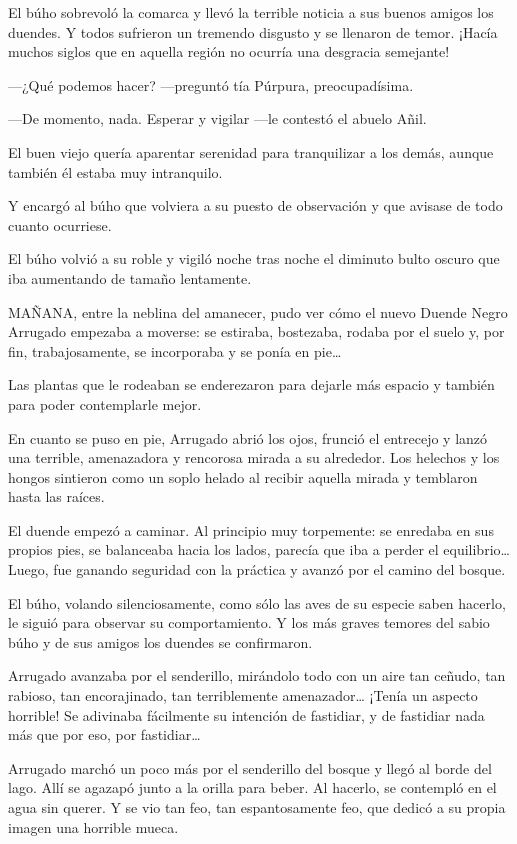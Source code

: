 \documentclass{barcodevapor3pags}
\begin{document}
El búho sobrevoló la comarca y llevó la terrible noticia a sus buenos
amigos los duendes. Y todos sufrieron un tremendo disgusto y se llenaron
de temor. ¡Hacía muchos siglos que en aquella región no ocurría una
desgracia semejante!

---¿Qué podemos hacer? ---preguntó tía Púrpura, preocupadísima.

---De momento, nada. Esperar y vigilar ---le contestó el abuelo Añil.

El buen viejo quería aparentar serenidad para tranquilizar a los demás,
aunque también él estaba muy intranquilo.

Y encargó al búho que volviera a su puesto de observación y que avisase
de todo cuanto ocurriese.

El búho volvió a su roble y vigiló noche tras noche el diminuto bulto
oscuro que iba aumentando de tamaño lentamente.

\capitulo

 MAÑANA, entre la neblina del amanecer, pudo ver cómo el nuevo Duende
Negro Arrugado empezaba a moverse: se estiraba, bostezaba, rodaba por el
suelo y, por fin, trabajosamente, se incorporaba y se ponía en
pie\ldots{}

Las plantas que le rodeaban se enderezaron para dejarle más espacio y
también para poder contemplarle mejor.

En cuanto se puso en pie, Arrugado abrió los ojos, frunció el entrecejo
y lanzó una terrible, amenazadora y rencorosa mirada a su alrededor. Los
helechos y los hongos sintieron como un soplo helado al recibir aquella
mirada y temblaron hasta las raíces.

El duende empezó a caminar. Al principio muy torpemente: se enredaba en
sus propios pies, se balanceaba hacia los lados, parecía que iba a
perder el equilibrio\ldots{} Luego, fue ganando seguridad con la
práctica y avanzó por el camino del bosque.

El búho, volando silenciosamente, como sólo las aves de su especie saben
hacerlo, le siguió para observar su comportamiento. Y los más graves
temores del sabio búho y de sus amigos los duendes se confirmaron.

Arrugado avanzaba por el senderillo, mirándolo todo con un aire tan
ceñudo, tan rabioso, tan encorajinado, tan terriblemente
amenazador\ldots{} ¡Tenía un aspecto horrible! Se adivinaba fácilmente
su intención de fastidiar, y de fastidiar nada más que por eso, por
fastidiar\ldots{}

Arrugado marchó un poco más por el senderillo del bosque y llegó al
borde del lago. Allí se agazapó junto a la orilla para beber. Al
hacerlo, se contempló en el agua sin querer. Y se vio tan feo, tan
espantosamente feo, que dedicó a su propia imagen una horrible mueca.
\end{document}
